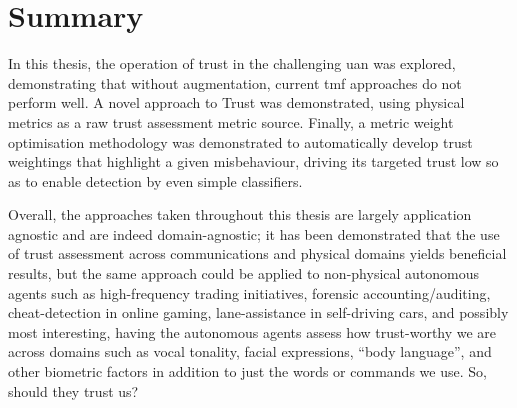 \section{Summary}

In this thesis, the operation of trust in the challenging \gls{uan} was explored, demonstrating that without augmentation, current \gls{tmf} approaches do not perform well.
A novel approach to Trust was demonstrated, using physical metrics as a raw trust assessment metric source.
Finally, a metric weight optimisation methodology was demonstrated to automatically develop trust weightings that highlight a given misbehaviour, driving its targeted trust low so as to enable detection by even simple classifiers.

Overall, the approaches taken throughout this thesis are largely application agnostic and are indeed domain-agnostic; it has been demonstrated that the use of trust assessment across communications and physical domains yields beneficial results, but the same approach could be applied to non-physical autonomous agents such as high-frequency trading initiatives, forensic accounting/auditing,  cheat-detection in online gaming, lane-assistance in self-driving cars, and possibly most interesting, having the autonomous agents assess how trust-worthy we are across domains such as vocal tonality, facial expressions, ``body language'', and other biometric factors in addition to just the words or commands we use.
So, should they trust us?